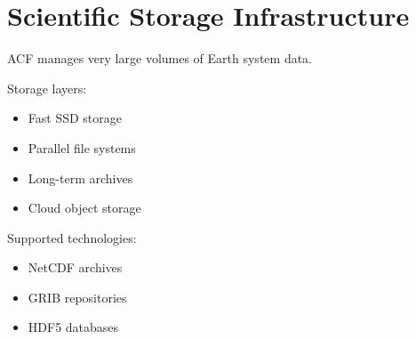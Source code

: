 \section{Scientific Storage Infrastructure}


ACF manages very large volumes of Earth system data.



Storage layers:


\begin{itemize}

\item Fast SSD storage

\item Parallel file systems

\item Long-term archives

\item Cloud object storage

\end{itemize}



Supported technologies:


\begin{itemize}

\item NetCDF archives

\item GRIB repositories

\item HDF5 databases

\end{itemize}
